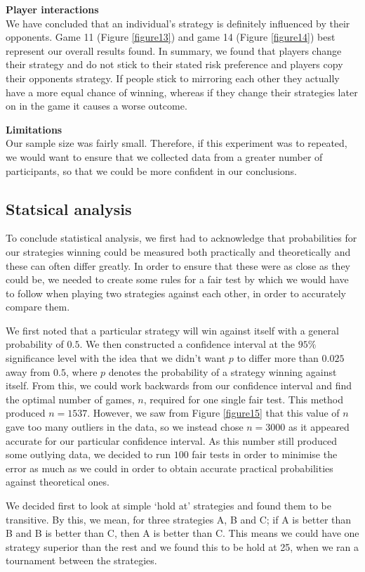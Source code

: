 \documentclass[a4paper,titlepage]{article}
\begin{document}
 \textbf{Player interactions}\\We have concluded that an individual’s strategy is definitely influenced by their opponents. Game 11 (Figure \ref{figure13}) and game 14 (Figure \ref{figure14}) best represent our overall results found. In summary, we found that players change their strategy and do not stick to their stated risk preference and players copy their opponents strategy. If people stick to mirroring each other they actually have a more equal chance of winning, whereas if they change their strategies later on in the game it causes a worse outcome.

 \textbf{Limitations}\\ Our sample size was fairly small. Therefore, if this experiment was to repeated, we would want to ensure that we collected data from a greater number of participants, so that we could be more confident in our conclusions.

\subsection{Statsical analysis}
To conclude statistical analysis, we first had to acknowledge that probabilities for our strategies winning could be measured both practically and theoretically and these can often differ greatly. In order to ensure that these were as close as they could be, we needed to create some rules for a fair test by which we would have to follow when playing two strategies against each other, in order to accurately compare them.

We first noted that a particular strategy will win against itself with a general probability of $0.5$. We then constructed a confidence interval at the $95\%$ significance level with the idea that we didn’t want $p$ to differ more than $0.025$ away from $0.5$, where $p$ denotes the probability of a strategy winning against itself. From this, we could work backwards from our confidence interval and find the optimal number of games, $n$, required for one single fair test. This method produced $n=1537$. However, we saw from Figure \ref{figure15} that this value of $n$ gave too many outliers in the data, so we instead chose $n=3000$ as it appeared accurate for our particular confidence interval. As this number still produced some outlying data, we decided to run $100$ fair tests in order to minimise the error as much as we could in order to obtain accurate practical probabilities against theoretical ones.

We decided first to look at simple ‘hold at’ strategies and found them to be transitive. By this, we mean, for three strategies A, B and C; if A is better than B and B is better than C, then A is better than C. This means we could have one strategy superior than the rest and we found this to be hold at 25, when we ran a tournament between the strategies.
\end{document}
